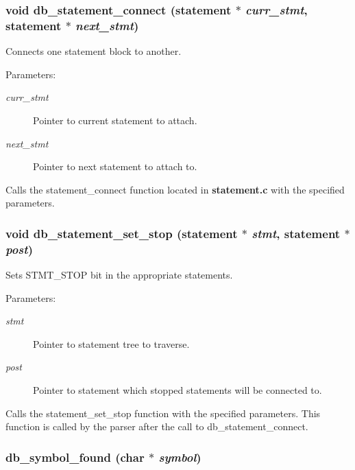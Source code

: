 \subsubsection{\setlength{\rightskip}{0pt plus 5cm}void db\_\-statement\_\-connect ({\bf statement} $\ast$ {\em curr\_\-stmt}, {\bf statement} $\ast$ {\em next\_\-stmt})}\label{db_8c_a26}


Connects one statement block to another.

\begin{Desc}
\item[Parameters: ]\par
\begin{description}
\item[{\em 
curr\_\-stmt}]Pointer to current statement to attach. \item[{\em 
next\_\-stmt}]Pointer to next statement to attach to.\end{description}
\end{Desc}
Calls the statement\_\-connect function located in {\bf statement.c} with the specified parameters. 
\subsubsection{\setlength{\rightskip}{0pt plus 5cm}void db\_\-statement\_\-set\_\-stop ({\bf statement} $\ast$ {\em stmt}, {\bf statement} $\ast$ {\em post})}\label{db_8c_a27}


Sets STMT\_\-STOP bit in the appropriate statements.

\begin{Desc}
\item[Parameters: ]\par
\begin{description}
\item[{\em 
stmt}]Pointer to statement tree to traverse. \item[{\em 
post}]Pointer to statement which stopped statements will be connected to.\end{description}
\end{Desc}
Calls the statement\_\-set\_\-stop function with the specified parameters. This function is called by the parser after the call to db\_\-statement\_\-connect. 
\subsubsection{ db\_\-symbol\_\-found (char $\ast$ {\em symbol})}\label{db_8c_a31}


